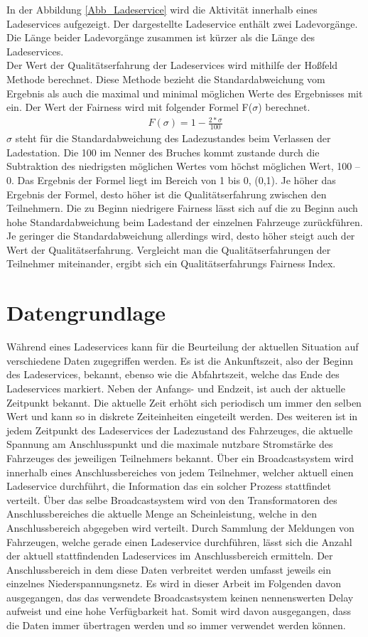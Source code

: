In der Abbildung \ref{Abb_Ladeservice} wird die Aktivität innerhalb eines Ladeservices aufgezeigt. Der dargestellte Ladeservice enthält zwei Ladevorgänge. Die Länge beider Ladevorgänge zusammen ist kürzer als die Länge des Ladeservices.\\
Der Wert der Qualitätserfahrung der Ladeservices wird mithilfe der Hoßfeld Methode \cite{Hosfeld2018} berechnet. Diese Methode bezieht die Standardabweichung vom Ergebnis als auch die maximal und minimal möglichen Werte des Ergebnisses mit ein. Der Wert der Fairness wird mit folgender Formel F($\sigma$) berechnet.
\begin{align}
	F(\sigma) = 1-\frac{2*\sigma}{100}
\end{align}
$\sigma$ steht für die Standardabweichung des Ladezustandes beim Verlassen der Ladestation. Die 100 im Nenner des Bruches kommt zustande durch die Subtraktion des niedrigsten möglichen Wertes vom höchst möglichen Wert, 100 – 0. Das Ergebnis der Formel liegt im Bereich von 1 bis 0, (0,1). Je höher das Ergebnis der Formel, desto höher ist die Qualitätserfahrung zwischen den Teilnehmern. Die zu Beginn niedrigere Fairness lässt sich auf die zu Beginn auch hohe Standardabweichung beim Ladestand der einzelnen Fahrzeuge zurückführen. Je geringer die Standardabweichung allerdings wird, desto höher steigt auch der Wert der Qualitätserfahrung. Vergleicht man die Qualitätserfahrungen der Teilnehmer miteinander, ergibt sich ein Qualitätserfahrungs Fairness Index.
\section{Datengrundlage}
\label{cap:background_sec:setting}
Während eines Ladeservices kann für die Beurteilung der aktuellen Situation auf verschiedene Daten zugegriffen werden. Es ist die Ankunftszeit, also der Beginn des Ladeservices, bekannt, ebenso wie die Abfahrtszeit, welche das Ende des Ladeservices markiert. Neben der Anfangs- und Endzeit, ist auch der aktuelle Zeitpunkt bekannt. Die aktuelle Zeit erhöht sich periodisch um immer den selben Wert und kann so in diskrete Zeiteinheiten eingeteilt werden. Des weiteren ist in jedem Zeitpunkt des Ladeservices der Ladezustand des Fahrzeuges, die aktuelle Spannung am Anschlusspunkt und die maximale nutzbare Stromstärke des Fahrzeuges des jeweiligen Teilnehmers bekannt. Über ein Broadcastsystem wird innerhalb eines Anschlussbereiches von jedem Teilnehmer, welcher aktuell einen Ladeservice durchführt, die Information das ein solcher Prozess stattfindet verteilt. Über das selbe Broadcastsystem wird von den Transformatoren des Anschlussbereiches die aktuelle Menge an Scheinleistung, welche in den Anschlussbereich abgegeben wird verteilt. Durch Sammlung der Meldungen von Fahrzeugen, welche gerade einen Ladeservice durchführen, lässt sich die Anzahl der aktuell stattfindenden Ladeservices im Anschlussbereich ermitteln. Der Anschlussbereich in dem diese Daten verbreitet werden umfasst jeweils ein einzelnes Niederspannungsnetz.  Es wird in dieser Arbeit im Folgenden davon ausgegangen, das das verwendete Broadcastsystem keinen nennenswerten Delay aufweist und eine hohe Verfügbarkeit hat. Somit wird davon ausgegangen, dass die Daten immer übertragen werden und so immer verwendet werden können.


